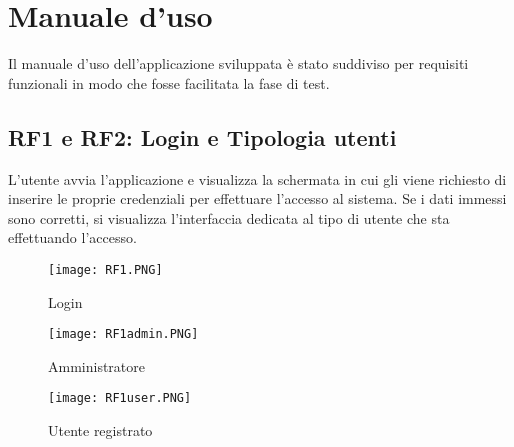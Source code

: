 \documentclass[12pt,a4paper,onecolumn,x11names]{article}
\begin{document}
\section{Manuale d'uso}
	\begin{flushleft}
		Il manuale d'uso dell'applicazione sviluppata è stato suddiviso per requisiti funzionali in modo che fosse facilitata la fase di test.
	\end{flushleft}
	\subsection{RF1 e RF2: Login e Tipologia utenti}
		\begin{flushleft}
			L'utente avvia l'applicazione e visualizza la schermata in cui gli viene richiesto di inserire le proprie credenziali per effettuare l'accesso al sistema.
			Se i dati immessi sono corretti, si visualizza l'interfaccia dedicata al tipo di utente che sta effettuando l'accesso.
		\end{flushleft}
		\begin{figure}[!h]
			\centering
			\texttt{[image: RF1.PNG]}
			\caption{Login}
		\end{figure}
	\begin{figure}[h!]
		\centering
		\begin{minipage}[c]{.45\textwidth}
			\texttt{[image: RF1admin.PNG]}
			\caption{Amministratore}
		\end{minipage}%
		\centering
		\begin{minipage}[c]{.45\textwidth}
			\texttt{[image: RF1user.PNG]}
			\caption{Utente registrato}
		\end{minipage}%
	\end{figure}
\newpage
\end{document}
